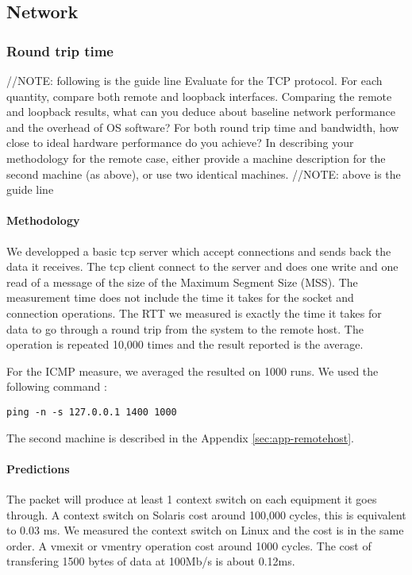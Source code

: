 \newpage
\subsection{Network}

\subsubsection{Round trip time}

//NOTE: following is the guide line
Evaluate for the TCP protocol. For each quantity, compare both remote and loopback interfaces. Comparing the remote and loopback results, what can you deduce about baseline network performance and the overhead of OS software? For both round trip time and bandwidth, how close to ideal hardware performance do you achieve? In describing your methodology for the remote case, either provide a machine description for the second machine (as above), or use two identical machines.
//NOTE: above is the guide line

\paragraph{Methodology}
We developped a basic tcp server which accept connections and sends back the
data it receives.
The tcp client connect to the server and does one write and one read of a message of
the size of the Maximum Segment Size (MSS).
The measurement time does not include the time it takes for the socket and
connection operations.
The RTT we measured is exactly the time it takes for data to go through a round trip from the system to the remote host.
The operation is repeated 10,000 times and the result reported is the average.

For the ICMP measure, we averaged the resulted on 1000 runs.
We used the following command :
\begin{verbatim}
ping -n -s 127.0.0.1 1400 1000
\end{verbatim}

The second machine is described in the Appendix \ref{sec:app-remotehost}.

\paragraph{Predictions}

The packet will produce at least 1 context switch on each equipment it goes
through.
A context switch on Solaris cost around 100,000 cycles, this
is equivalent to 0.03 ms.
We measured the context switch on Linux and the cost is in the same order.
A vmexit or vmentry operation cost around 1000 cycles.
The cost of transfering 1500 bytes of data at 100Mb/s is about 0.12ms.

